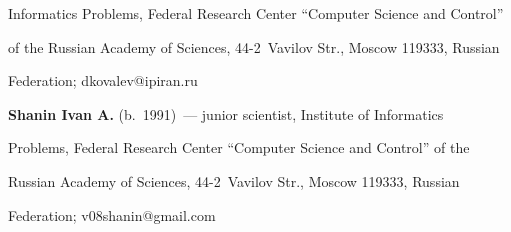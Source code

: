 Informatics Problems, Federal Research Center ``Computer Science and Control'' 


of the Russian Academy of Sciences, 44-2~Vavilov Str.,  Moscow 119333, Russian 


Federation; \mbox{dkovalev@ipiran.ru}


    


    \vspace*{3pt}


    


    \noindent


    \textbf{Shanin Ivan A.} (b.\ 1991)~--- junior scientist, Institute of Informatics 


Problems, Federal Research Center ``Computer Science and Control'' of the 


Russian Academy of Sciences, 44-2~Vavilov Str., Moscow 119333, Russian 


Federation; \mbox{v08shanin@gmail.com}


\label{end\stat}





\renewcommand{\bibname}{\protect\rm Литература} 


